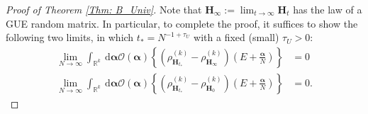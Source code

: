 \begin{proof}[Proof of Theorem \ref{Thm: B_Univ}]
Note that ${\mathbf{H}}_{\infty}:=\lim_{t\to\infty}{\mathbf{H}}_{t}$ has the law of a GUE random matrix. In particular, to complete the proof, it suffices to show the following two limits, in which $t_{*}=N^{-1+\tau_{U}}$ with a fixed (small) $\tau_{U}>0$:
%
\begin{align}
\lim _{N \rightarrow \infty} \int_{\mathbb{R}^k} \mathrm{~d} \boldsymbol{\alpha} \mathcal{O}(\boldsymbol{\alpha})\left\{\left(\rho_{{\mathbf{H}}_{t_*}}^{(k)}-\rho_{{\mathbf{H}}_\infty}^{(k)}\right)\left(E+\frac{\boldsymbol{\alpha}}{N}\right)\right\}&=0\label{1infyuniv}\\
\lim _{N \rightarrow \infty} \int_{\mathbb{R}^k} \mathrm{~d} \boldsymbol{\alpha} \mathcal{O}(\boldsymbol{\alpha})\left\{\left(\rho_{{\mathbf{H}}_{t_*}}^{(k)}-\rho_{{\mathbf{H}}_{0}}^{(k)}\right)\left(E+\frac{\boldsymbol{\alpha}}{N}\right)\right\}&=0.\label{univ-main}
\end{align}
%

\end{proof}
